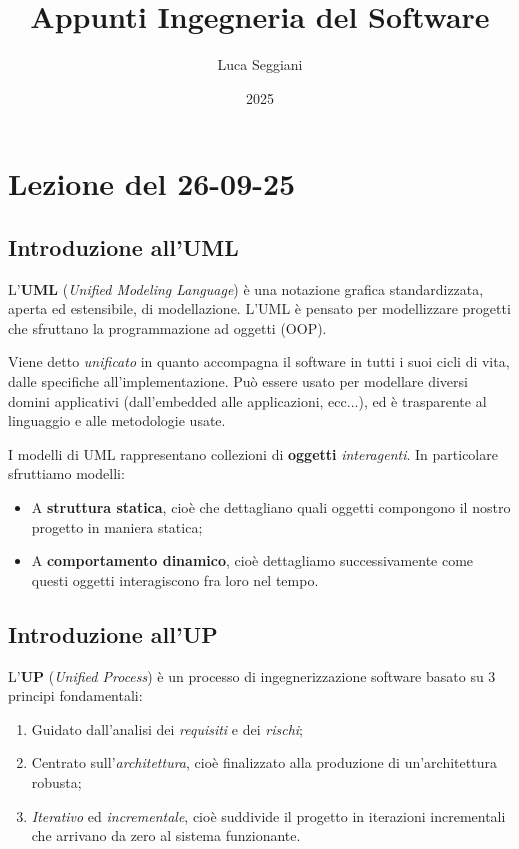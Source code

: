 \documentclass[a4paper,11pt]{article}
\title{Appunti Ingegneria del Software}
\author{Luca Seggiani}
\date{2025}
\begin{document}
\section{Lezione del 26-09-25}

\thispagestyle{empty}
\pagestyle{fancy}

\subsection{Introduzione all'UML}
L'\textbf{UML} (\textit{Unified Modeling Language}) è una notazione grafica standardizzata, aperta ed estensibile, di modellazione. 
L'UML è pensato per modellizzare progetti che sfruttano la programmazione ad oggetti (OOP).

Viene detto \textit{unificato} in quanto accompagna il software in tutti i suoi cicli di vita, dalle specifiche all'implementazione.
Può essere usato per modellare diversi domini applicativi (dall'embedded alle applicazioni, ecc...), ed è trasparente al linguaggio e alle metodologie usate.

I modelli di UML rappresentano collezioni di \textbf{oggetti} \textit{interagenti}. In particolare sfruttiamo modelli:
\begin{itemize}
	\item A \textbf{struttura statica}, cioè che dettagliano quali oggetti compongono il nostro progetto in maniera statica;
	\item A \textbf{comportamento dinamico}, cioè dettagliamo successivamente come questi oggetti interagiscono fra loro nel tempo.
\end{itemize}

\subsection{Introduzione all'UP}
L'\textbf{UP} (\textit{Unified Process}) è un processo di ingegnerizzazione software basato su 3 principi fondamentali:
\begin{enumerate}
	\item Guidato dall'analisi dei \textit{requisiti} e dei \textit{rischi};
	\item Centrato sull'\textit{architettura}, cioè finalizzato alla produzione di un'architettura robusta;
	\item \textit{Iterativo} ed \textit{incrementale}, cioè suddivide il progetto in iterazioni incrementali che arrivano da zero al sistema funzionante.
\end{enumerate}
\end{document}
